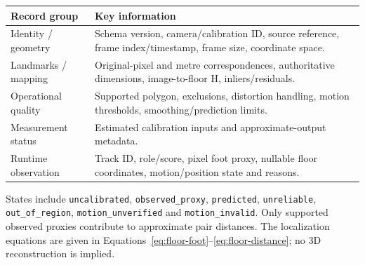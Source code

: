 \begin{tabular}{P{0.28\textwidth}P{0.59\textwidth}}
\toprule
Record group & Key information\\
\midrule
Identity / geometry & Schema version, camera/calibration ID, source reference, frame index/timestamp, frame size, coordinate space.\\
Landmarks / mapping & Original-pixel and metre correspondences, authoritative dimensions, image-to-floor H, inliers/residuals.\\
Operational quality & Supported polygon, exclusions, distortion handling, motion thresholds, smoothing/prediction limits.\\
Measurement status & Estimated calibration inputs and approximate-output metadata.\\
Runtime observation & Track ID, role/score, pixel foot proxy, nullable floor coordinates, motion/position state and reasons.\\
\bottomrule
\end{tabular}

States include \texttt{uncalibrated}, \texttt{observed\_proxy}, \texttt{predicted}, \texttt{unreliable}, \texttt{out\_of\_region}, \texttt{motion\_unverified} and \texttt{motion\_invalid}. Only supported observed proxies contribute to approximate pair distances. The localization equations are given in Equations~\ref{eq:floor-foot}--\ref{eq:floor-distance}; no 3D reconstruction is implied.
